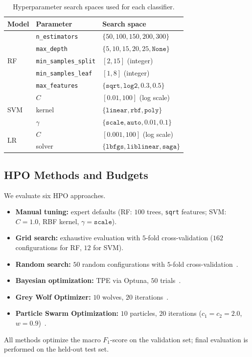 \documentclass[letterpaper, 10 pt, conference]{ieeeconf}
\begin{document}
\begin{table}[h]
	\caption{Hyperparameter search spaces used for each classifier.}
	\label{tab:hyperparam_spaces}
	\centering
	\scriptsize
	\begin{tabular}{|l|l|p{4.2cm}|}
		\hline
		\textbf{Model} & \textbf{Parameter} & \textbf{Search space} \\
		\hline
		\multirow{5}{*}{RF}
		& \texttt{n\_estimators} & $\{50, 100, 150, 200, 300\}$ \\
		& \texttt{max\_depth} & $\{5, 10, 15, 20, 25, \texttt{None}\}$ \\
		& \texttt{min\_samples\_split} & $[2, 15]$ (integer) \\
		& \texttt{min\_samples\_leaf} & $[1, 8]$ (integer) \\
		& \texttt{max\_features} & $\{\texttt{sqrt}, \texttt{log2}, 0.3, 0.5\}$ \\
		\hline
		\multirow{3}{*}{SVM}
		& $C$ & $[0.01, 100]$ (log scale) \\
		& kernel & $\{\texttt{linear}, \texttt{rbf}, \texttt{poly}\}$ \\
		& $\gamma$ & $\{\texttt{scale}, \texttt{auto}, 0.01, 0.1\}$ \\
		\hline
		\multirow{2}{*}{LR}
		& $C$ & $[0.001, 100]$ (log scale) \\
		& solver & $\{\texttt{lbfgs}, \texttt{liblinear}, \texttt{saga}\}$ \\
		\hline
	\end{tabular}
\end{table}

\subsection{HPO Methods and Budgets}

We evaluate six HPO approaches.
\begin{itemize}
	\item \textbf{Manual tuning:} expert defaults (RF: $100$ trees, \texttt{sqrt} features; SVM: $C=1.0$, RBF kernel, $\gamma=\texttt{scale}$).
	\item \textbf{Grid search:} exhaustive evaluation with $5$-fold cross-validation ($162$ configurations for RF, $12$ for SVM).
	\item \textbf{Random search:} $50$ random configurations with $5$-fold cross-validation~\cite{bergstra2012}.
	\item \textbf{Bayesian optimization:} TPE via Optuna, $50$ trials~\cite{snoek2012}.
	\item \textbf{Grey Wolf Optimizer:} $10$ wolves, $20$ iterations~\cite{mirjalili2014}.
	\item \textbf{Particle Swarm Optimization:} $10$ particles, $20$ iterations ($c_1 = c_2 = 2.0$, $w = 0.9$)~\cite{kennedy1995}.
\end{itemize}
All methods optimize the macro $F_1$-score on the validation set; final evaluation is performed on the held-out test set.
\end{document}
